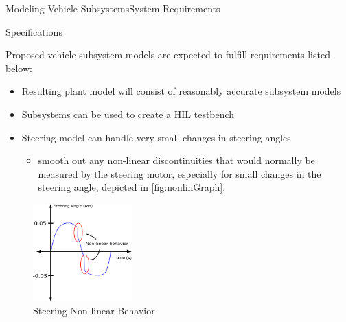 \documentclass{beamer}
\begin{document}
\begin{frame}{Modeling Vehicle Subsystems}{System Requirements}
	\begin{block}{Specifications}
	\begin{minipage}[t]{0.62\linewidth}    
    Proposed vehicle subsystem models are expected to fulfill requirements listed below:
	\begin{itemize}
    		\item Resulting plant model will consist of reasonably accurate subsystem models
    		\item Subsystems can be used to create a HIL testbench
    		\item Steering model can handle very small changes in steering angles
    \begin{itemize}
		\item smooth out any non-linear discontinuities that would normally be measured by the steering motor, especially for small changes in the steering angle, depicted in \autoref{fig:nonlinGraph}.
    \end{itemize}
	\end{itemize}
	\end{minipage}
	\begin{minipage}[t]{0.34\linewidth}
	\begin{figure}[h]
		\centering
    		\captionsetup{justification=centering, margin=0.5cm}
    		\includegraphics[width=1.5in]{figs/inkscape/nonlinearBehavior}
    		\caption{Steering Non-linear Behavior}
    		\label{fig:nonlinGraph}
	\end{figure}
	\end{minipage}
\end{block}
\end{frame}
\end{document}
